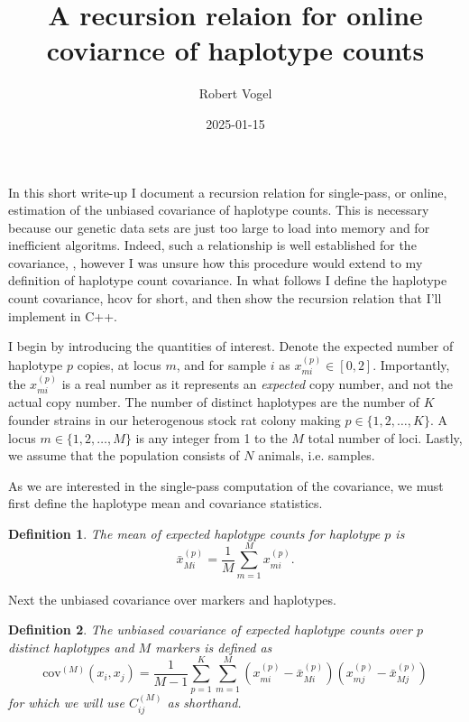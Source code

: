 \documentclass{article}
\author{Robert Vogel}
\title{A recursion relaion for online coviarnce
of haplotype counts}
\date{2025-01-15}
\newtheorem{definition}{Definition}
\newcommand{\set}[1]{\{#1\}}
\newcommand{\hapP}[1]{x_{#1}^{(p)}}
\newcommand{\hap}[1]{x_{#1}}
\newcommand{\bhapP}[1]{\bar{x}_{#1}^{(p)}}
\newcommand{\hcovarianceM}[1]{\text{cov}^{(#1)}}
\newcommand{\hcovM}[1]{C^{(#1)}}
\begin{document}
\maketitle


In this short write-up I document a recursion relation for single-pass,
or online, estimation of the unbiased covariance of haplotype counts.  This is
necessary because our genetic data sets are just too large to load into memory 
and for inefficient algoritms.  Indeed,
such a relationship is well established for the covariance, \cite{wikiOnlineCov},
however I was unsure how this procedure would extend to my definition of
haplotype count covariance.  In what follows I define the haplotype count
covariance, hcov for short, and then show the recursion relation that I'll
implement in C++.

I begin by introducing the quantities of interest.  Denote the expected number of
haplotype $p$ copies, at locus $m$, and for sample $i$ as $\hapP{mi} \in [0,2]$.
Importantly, the $\hapP{mi}$ is a real number as it represents an \emph{expected}
copy number, and not the actual copy number.  The number of distinct haplotypes are
the number of $K$ founder strains in our heterogenous stock rat colony making 
$p\in\set{1,2,\dots,K}$.  A locus $m\in\set{1,2,\dots,M}$ is any integer from 1 to
the $M$ total number of loci.  Lastly, we assume that the population consists of 
$N$ animals, i.e. samples.

As we are interested in the single-pass computation of the covariance, we must
first define the haplotype mean and covariance statistics.

\begin{definition}\label{def:hmean}
    The mean of expected haplotype counts for haplotype $p$ is
    \begin{equation}\nonumber
        \bhapP{Mi} = \frac{1}{M} \sum_{m=1}^M \hapP{mi}.
    \end{equation}
\end{definition}

Next the unbiased covariance over markers and haplotypes.

\begin{definition}\label{def:hcov}
    The unbiased covariance of expected haplotype counts over $p$ distinct haplotypes
    and $M$ markers is defined as
    \begin{equation}\nonumber
        \hcovarianceM{M}(\hap{i},\hap{j}) = \frac{1}{M-1}\sum_{p=1}^K\sum_{m=1}^M
            \left(\hapP{mi} - \bhapP{Mi}\right)
            \left(\hapP{mj} - \bhapP{Mj}\right)
    \end{equation}
    for which we will use $\hcovM{M}_{ij}$ as shorthand.
\end{definition}
\end{document}
